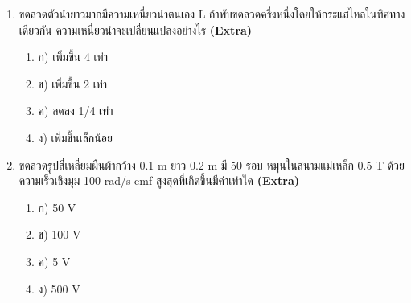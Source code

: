 \documentclass[12pt]{article}
\begin{document}
\begin{enumerate}[label=\arabic*.]
\begin{enumerate}[label=)]
\item ก) น้อยกว่าปกติ
\item ข) มากขึ้นเพราะกระแสเหนี่ยวนำต้านการเคลื่อนที่
\item ค) เท่าเดิม
\item ง) เป็นศูนย์
\end{enumerate}
\item ขดลวดตัวนำยาวมากมีความเหนี่ยวนำตนเอง L ถ้าพับขดลวดครึ่งหนึ่งโดยให้กระแสไหลในทิศทางเดียวกัน ความเหนี่ยวนำจะเปลี่ยนแปลงอย่างไร \hfill \textbf{\small (Extra)}
\begin{enumerate}[label=)]
\item ก) เพิ่มขึ้น 4 เท่า
\item ข) เพิ่มขึ้น 2 เท่า
\item ค) ลดลง 1/4 เท่า
\item ง) เพิ่มขึ้นเล็กน้อย
\end{enumerate}
\item ขดลวดรูปสี่เหลี่ยมผืนผ้ากว้าง 0.1 m ยาว 0.2 m มี 50 รอบ หมุนในสนามแม่เหล็ก 0.5 T ด้วยความเร็วเชิงมุม 100 rad/s emf สูงสุดที่เกิดขึ้นมีค่าเท่าใด \hfill \textbf{\small (Extra)}
\begin{enumerate}[label=)]
\item ก) 50 V
\item ข) 100 V
\item ค) 5 V
\item ง) 500 V
\end{enumerate}
\end{enumerate}
\end{document}
